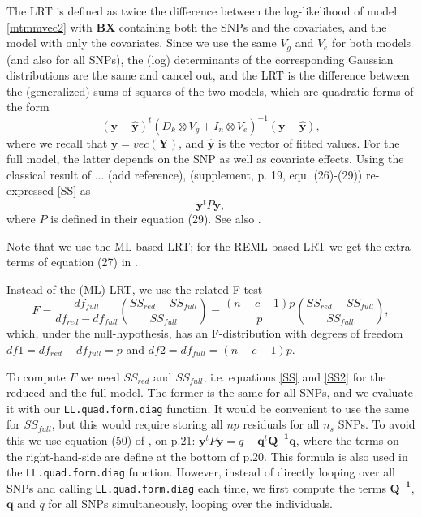 \documentclass[12pt]{article}
\begin{document}
The LRT is defined as twice the difference between the log-likelihood of model \eqref{mtmmvec2} with $\mathbf{B} \mathbf{X}$ containing both the SNPs and the covariates, and the model with only the covariates. Since we use the same $V_g$ and $V_e$ for both models (and also for all SNPs), the (log) determinants of the corresponding Gaussian distributions are the same and cancel out, and the LRT is the difference between the (generalized) sums of squares of the two models, which are quadratic forms of the form
%
\begin{equation} \label{SS}
(\mathbf{y} - \mathbf{\hat  y})^t \left(D_k \otimes V_g  + I_n \otimes V_e\right)^{-1} (\mathbf{y} - \mathbf{\hat  y}),
\end{equation}
%  
where we recall that $\mathbf{y} = vec(\mathbf{Y})$, and $\mathbf{\hat  y}$ is the vector of fitted values. 
For the full model, the latter depends on the SNP as well as covariate effects. Using the classical result of ... (add reference), \cite{zhou_stephens_2014} (supplement, p. 19, equ. (26)-(29)) re-expressed \eqref{SS} as
\begin{equation} \label{SS2}
\mathbf{y}^t P \mathbf{y},
\end{equation}
where $P$ is defined in their equation (29). See also  \cite{johnson_thompson_1995}. 

Note that we use the ML-based LRT; for the REML-based LRT we get the extra terms of equation (27) in \cite{zhou_stephens_2014}.

Instead of the (ML) LRT, we use the related F-test
%
\begin{equation} \label{Ftest}
F = \frac{df_{full}}{df_{red} - df_{full}} \left(\frac{SS_{red} - SS_{full}}{SS_{full}}\right) = \frac{(n-c-1)p}{p} \left(\frac{SS_{red} - SS_{full}}{SS_{full}}\right),
\end{equation}
%
which, under the null-hypothesis, has an F-distribution with degrees of freedom $df1 = df_{red} - df_{full} = p$ and $df2 = df_{full} = (n-c-1)p$.

To compute $F$ we need $SS_{red}$ and $SS_{full}$, i.e. equations \eqref{SS} and \eqref{SS2} for the reduced and the full model. The former is the same for all SNPs, and we evaluate it with our \verb|LL.quad.form.diag| function. It would be convenient to use the same for $SS_{full}$, but this would require storing all $np$ residuals for all $n_s$ SNPs. To avoid this we use equation (50) of \cite{zhou_stephens_2014}, on p.21: $\mathbf{y}^t P \mathbf{y} = q - \mathbf{q}^t \mathbf{Q^{-1}} \mathbf{q}$, where the terms on the right-hand-side are define at the bottom of p.20. This formula is also used in the \verb|LL.quad.form.diag| function. However, instead of directly looping over all SNPs and calling \verb|LL.quad.form.diag| each time, we first compute the terms $\mathbf{Q^{-1}}$,  $\mathbf{q}$ and $q$ for all SNPs simultaneously, looping over the individuals.   
\end{document}
